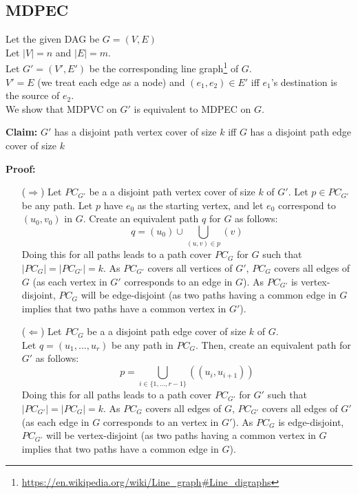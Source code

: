 \documentclass[11pt, fleqn]{article}
\begin{document}
\newpage
\subsection*{MDPEC}
Let the given DAG be $G = (V, E)$\\
Let $|V| = n$ and $|E| = m$.\\
Let $G' = (V', E')$ be the corresponding line graph\footnote{\url{https://en.wikipedia.org/wiki/Line_graph\#Line_digraphs}} of $G$.\\
$V' = E$ (we treat each edge as a node) and $(e_1, e_2) \in E' $ iff $e_1$'s destination is the source of $e_2$.\\
We show that MDPVC on $G'$ is equivalent to MDPEC on $G$.

\smallskip
\textbf{Claim:} $G'$ has a disjoint path vertex cover of size $k$ iff $G$ has a disjoint path edge cover of size $k$

\smallskip
\textbf{Proof:}
\begin{itemize}
    \item[($\Rightarrow$)] 
    Let $PC_{G'}$ be a a disjoint path vertex cover of size $k$ of $G'$. Let $p \in PC_{G'}$ be any path. Let $p$ have $e_0$ as the starting vertex, and let $e_0$ correspond to $(u_0, v_0)$ in $G$. Create an equivalent path $q$ for $G$ as follows:
    $$q = (u_0) \cup \bigcup_{(u, v) \in p} (v)$$
    Doing this for all paths leads to a path cover $PC_{G}$ for $G$ such that $|PC_G| = |PC_{G'}| = k$. As $PC_{G'}$ covers all vertices of $G'$, $PC_G$ covers all edges of $G$ (as each vertex in $G'$ corresponds to an edge in $G$). As $PC_{G'}$ is vertex-disjoint, $PC_G$ will be edge-disjoint (as two paths having a common edge in $G$ implies that two paths have a common vertex in $G'$).
    \item[($\Leftarrow$)]
    Let $PC_{G}$ be a a disjoint path edge cover of size $k$ of $G$.\\
    Let $q = (u_1, \ldots, u_r)$ be any path in $PC_G$. Then, create an equivalent path for $G'$ as follows:
    $$
        p = \bigcup_{i \in \{1, \ldots, r-1\}} ((u_i, u_{i+1}))
    $$
     Doing this for all paths leads to a path cover $PC_{G'}$ for $G'$ such that $|PC_{G'}| = |PC_{G}| = k$. As $PC_{G}$ covers all edges of $G$, $PC_{G'}$ covers all edges of $G'$ (as each edge in $G$ corresponds to an vertex in $G'$). As $PC_{G}$ is edge-disjoint, $PC_{G'}$ will be vertex-disjoint (as two paths having a common vertex in $G$ implies that two paths have a common edge in $G$).
\end{itemize}
\end{document}
